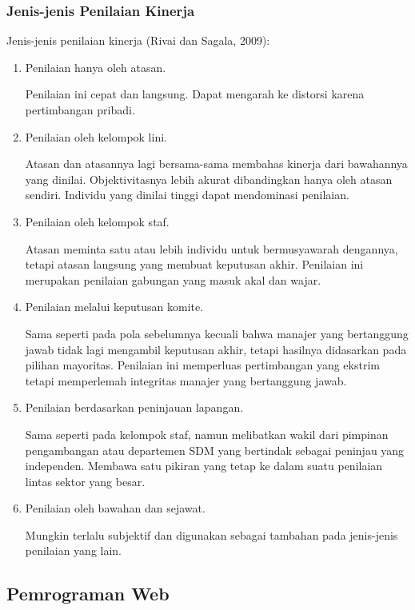     \subsubsection{Jenis-jenis Penilaian Kinerja}
    Jenis-jenis penilaian kinerja (Rivai dan Sagala, 2009):
    \begin{enumerate}
        \itemsep0em
        \item Penilaian hanya oleh atasan.
        
        Penilaian ini cepat dan langsung. Dapat mengarah ke distorsi karena pertimbangan pribadi.
        \item Penilaian oleh kelompok lini.
        
        Atasan dan atasannya lagi bersama-sama membahas kinerja dari bawahannya yang dinilai. Objektivitasnya lebih akurat dibandingkan hanya oleh atasan sendiri. Individu yang dinilai tinggi dapat mendominasi penilaian.
        \item Penilaian oleh kelompok staf.
        
        Atasan meminta satu atau lebih individu untuk bermusyawarah dengannya, tetapi atasan langsung yang membuat keputusan akhir. Penilaian ini merupakan penilaian gabungan yang masuk akal dan wajar.
        \item Penilaian melalui keputusan komite.
        
        Sama seperti pada pola sebelumnya kecuali bahwa manajer yang bertanggung jawab tidak lagi mengambil keputusan akhir, tetapi hasilnya didasarkan pada pilihan mayoritas. Penilaian ini memperluas pertimbangan yang ekstrim tetapi memperlemah integritas manajer yang bertanggung jawab.
        \item Penilaian berdasarkan peninjauan lapangan.
        
        Sama seperti pada kelompok staf, namun melibatkan wakil dari pimpinan pengambangan atau departemen SDM yang bertindak sebagai peninjau yang independen. Membawa satu pikiran yang tetap ke dalam suatu penilaian lintas sektor yang besar.
        \item Penilaian oleh bawahan dan sejawat.
        
        Mungkin terlalu subjektif dan digunakan sebagai tambahan pada jenis-jenis penilaian yang lain.
    \end{enumerate}

  \subsection{Pemrograman Web}

